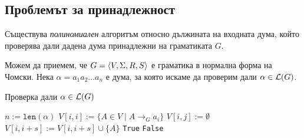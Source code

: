 \subsection{Проблемът за принадлежност}

\begin{thm}
  Съществува {\em полиномиален} алгоритъм относно дължината на входната дума, който проверява дали дадена дума принадлежни на граматиката $G$.
\end{thm}
Можем да приемем, че $G = \langle{V,\Sigma,R,S}\rangle$ е граматика в нормална форма на Чомски.
Нека $\alpha = a_1a_2\dots a_n$ е дума, за която искаме да проверим дали $\alpha \in \mathcal{L}(G)$.
\begin{algorithm}[H]
  \caption{Проверка дали $\alpha \in \mathcal{L}(G)$}
  \label{alg:belongs-to-grammar}
  \begin{algorithmic}[1]
    \State $n := \texttt{len}(\alpha)$ 
    \State $V[i,i] := \{A \in V \mid A\to_G a_i\}$
    \EndFor
    \State $V[i,j] := \emptyset$
    \EndFor      
    \ForAll{$s \in [1, n)$} 
    \ForAll{$k \in [i, i + s)$}
    \State $V[i,i+s] := V[i,i+s] \cup \{A\}$
    \EndIf
    \EndFor
    \EndFor
    \EndFor
    \State \Return \texttt{True}
    \Else
    \State \Return \texttt{False}
    \EndIf
  \end{algorithmic}
\end{algorithm}

